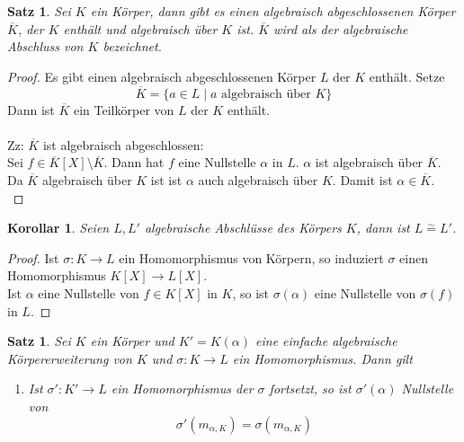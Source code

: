 \documentclass[10pt,a4paper]{article}
\newcommand{\al}{\ensuremath{\alpha}}
\newcommand{\isom}{\overset{\sim}{=}}
\theoremstyle{plain}
\newtheorem{kor}[theorem]{Korollar}
\newtheorem{satz}[theorem]{Satz}
\theoremstyle{definition}
\theoremstyle{remark}
\begin{document}
 	\begin{satz}
 		Sei $K$ ein Körper, dann gibt es einen algebraisch abgeschlossenen Körper $\overline{K}$, der $K$ enthält und algebraisch über $K$ ist. $\overline{K}$ wird als der algebraische Abschluss von $K$ bezeichnet.
 	\end{satz}
 	\begin{proof}
 		Es gibt einen algebraisch abgeschlossenen Körper $L$ der $K$ enthält. Setze\[\overline{K}=\{a\in L\mid \text{$a$ algebraisch über $K$}\}\]
 		Dann ist $\overline{K}$ ein Teilkörper von $L$ der $K$ enthält.\\
 		\\
 		Zz: $\overline{K}$ ist algebraisch abgeschlossen:\\
 		Sei $f\in\overline{K}[X]\setminus\overline{K}$. Dann hat $f$ eine Nullstelle $\al$ in $L$. $\al$ ist algebraisch über $\overline{K}$. Da $\overline{K}$ algebraisch über $K$ ist ist $\al$ auch algebraisch über $K$. Damit ist $\al\in\overline{K}$.\\
 	\end{proof}
 
 	\begin{kor}
 		Seien $L,L'$ algebraische Abschlüsse des Körpers $K$, dann ist $L\isom L'$.
 	\end{kor}
 	\begin{proof}
 		Ist $\sigma:K\to L$ ein Homomorphismus von Körpern, so induziert $\sigma$ einen Homomorphismus $K[X]\to L[X]$.\\
 		Ist $\al$ eine Nullstelle von $f\in K[X]$ in $K$, so ist $\sigma(\al)$ eine Nullstelle von $\sigma(f)$ in $L$.
 	\end{proof}
 
 	\begin{satz}
 		Sei $K$ ein Körper und $K'=K(\al)$ eine einfache algebraische Körpererweiterung von $K$ und $\sigma:K\to L$ ein Homomorphismus. Dann gilt
 		\begin{enumerate}
 			\item Ist $\sigma':K'\to L$ ein Homomorphismus der $\sigma$ fortsetzt, so ist $\sigma'(\al)$ Nullstelle von
 			\[\sigma'(m_{\al,K})=\sigma(m_{\al,K})\]
 		\end{enumerate}
 	\end{satz}
 
\end{document}
